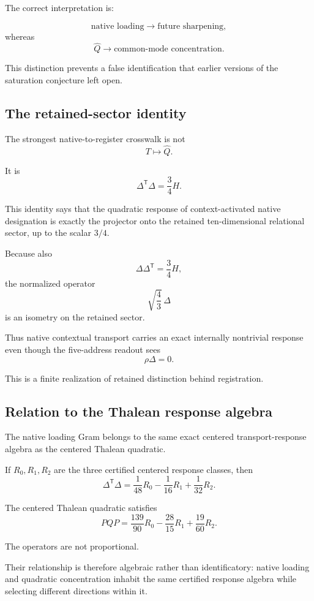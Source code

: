 The correct interpretation is:

\[
\text{native loading}
\longrightarrow
\text{future sharpening},
\]
whereas
\[
\widehat Q
\longrightarrow
\text{common-mode concentration}.
\]

This distinction prevents a false identification that earlier
versions of the saturation conjecture left open.

\subsection{The retained-sector identity}

The strongest native-to-register crosswalk is not
\[
T\mapsto\widehat Q.
\]

It is
\[
\Delta^{\mathsf T}\Delta=\frac34H.
\]

This identity says that the quadratic response of context-activated
native designation is exactly the projector onto the retained
ten-dimensional relational sector, up to the scalar \(3/4\).

Because also
\[
\Delta\Delta^{\mathsf T}=\frac34H,
\]
the normalized operator
\[
\sqrt{\frac43}\,\Delta
\]
is an isometry on the retained sector.

Thus native contextual transport carries an exact internally
nontrivial response even though the five-address readout sees
\[
\rho\Delta=0.
\]

This is a finite realization of retained distinction behind
registration.

\subsection{Relation to the Thalean response algebra}

The native loading Gram belongs to the same exact centered
transport-response algebra as the centered Thalean quadratic.

If \(R_0,R_1,R_2\) are the three certified centered response classes,
then
\[
\Delta^{\mathsf T}\Delta
=
\frac1{48}R_0
-
\frac1{16}R_1
+
\frac1{32}R_2.
\]

The centered Thalean quadratic satisfies
\[
PQP
=
\frac{139}{90}R_0
-
\frac{28}{15}R_1
+
\frac{19}{60}R_2.
\]

The operators are not proportional.

Their relationship is therefore algebraic rather than identificatory:
native loading and quadratic concentration inhabit the same certified
response algebra while selecting different directions within it.

